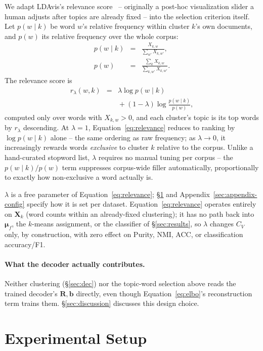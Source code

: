 \documentclass[11pt]{article}
\begin{document}
We adapt LDAvis's relevance score~\citep{sievert2014ldavis} -- originally a post-hoc visualization slider a human adjusts after topics are already fixed -- into the selection criterion itself. Let $p(w\mid k)$ be word $w$'s relative frequency within cluster $k$'s own documents, and $p(w)$ its relative frequency over the whole corpus:
\begin{eqnarray}
p(w\mid k) &=& \frac{X_{k,w}}{\sum_{w'} X_{k,w'}}, \label{eq:pwk}\\
p(w) &=& \frac{\sum_k X_{k,w}}{\sum_{k,w'} X_{k,w'}}. \label{eq:pw}
\end{eqnarray}
The relevance score is
\begin{eqnarray}
r_\lambda(w,k) &=& \lambda \log p(w\mid k) \nonumber\\
&& {} + (1-\lambda)\log\frac{p(w\mid k)}{p(w)},
\label{eq:relevance}
\end{eqnarray}
computed only over words with $X_{k,w}>0$, and each cluster's topic is its top words by $r_\lambda$ descending. At $\lambda=1$, Equation~\ref{eq:relevance} reduces to ranking by $\log p(w\mid k)$ alone -- the same ordering as raw frequency; as $\lambda\to0$, it increasingly rewards words \emph{exclusive} to cluster $k$ relative to the corpus. Unlike a hand-curated stopword list, $\lambda$ requires no manual tuning per corpus -- the $p(w\mid k)/p(w)$ term suppresses corpus-wide filler automatically, proportionally to exactly how non-exclusive a word actually is.

$\lambda$ is a free parameter of Equation~\ref{eq:relevance}; \S\ref{sec:setup} and Appendix~\ref{sec:appendix-config} specify how it is set per dataset. Equation~\ref{eq:relevance} operates entirely on $\mathbf{X}_k$ (word counts within an already-fixed clustering); it has no path back into $\boldsymbol{\mu}_f$, the $k$-means assignment, or the classifier of \S\ref{sec:results}, so $\lambda$ changes $C_V$ only, by construction, with zero effect on Purity, NMI, ACC, or classification accuracy/F1.

\paragraph{What the decoder actually contributes.} Neither clustering (\S\ref{sec:dec}) nor the topic-word selection above reads the trained decoder's $\mathbf{R},\mathbf{b}$ directly, even though Equation~\ref{eq:elbo}'s reconstruction term trains them. \S\ref{sec:discussion} discusses this design choice.

\section{Experimental Setup}
\label{sec:setup}
\end{document}
